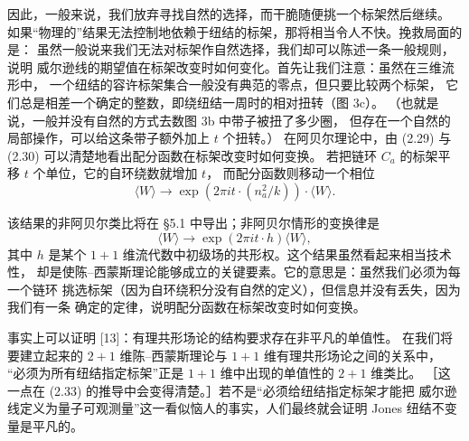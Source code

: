 \documentclass[11pt,a4paper]{article}
\begin{document}
因此，一般来说，我们放弃寻找自然的选择，而干脆随便挑一个标架然后继续。
如果“物理的”结果无法控制地依赖于纽结的标架，那将相当令人不快。挽救局面的是：
虽然一般说来我们无法对标架作自然选择，我们却可以陈述一条一般规则，说明
威尔逊线的期望值在标架改变时如何变化。首先让我们注意：虽然在三维流形中，
一个纽结的容许标架集合一般没有典范的零点，但只要比较两个标架，
它们总是相差一个确定的整数，即绕纽结一周时的相对扭转（图 3c）。
（也就是说，一般并没有自然的方式去数图 3b 中带子被扭了多少圈，
但存在一个自然的局部操作，可以给这条带子额外加上 $t$ 个扭转。）
在阿贝尔理论中，由 (2.29) 与 (2.30) 可以清楚地看出配分函数在标架改变时如何变换。
若把链环 $C_a$ 的标架平移 $t$ 个单位，它的自环绕数就增加 $t$，
而配分函数则移动一个相位
\begin{equation}
    \langle W\rangle\to\exp\left(2\pi i t\cdot (n_a^2/k)\right)\cdot\langle W\rangle .
    \tag{2.32}
\end{equation}

该结果的非阿贝尔类比将在 §5.1 中导出；非阿贝尔情形的变换律是
\begin{equation}
    \langle W\rangle\to\exp\left(2\pi i t\cdot h\right)\langle W\rangle ,
    \tag{2.33}
\end{equation}
其中 $h$ 是某个 $1+1$ 维流代数中初级场的共形权。这个结果虽然看起来相当技术性，
却是使陈–西蒙斯理论能够成立的关键要素。它的意思是：虽然我们必须为每一个链环
挑选标架（因为自环绕积分没有自然的定义），但信息并没有丢失，因为我们有一条
确定的定律，说明配分函数在标架改变时如何变换。


事实上可以证明 [13]：有理共形场论的结构要求存在非平凡的单值性。
在我们将要建立起来的 $2+1$ 维陈–西蒙斯理论与 $1+1$ 维有理共形场论之间的关系中，
“必须为所有纽结指定标架”正是 $1+1$ 维中出现的单值性的 $2+1$ 维类比。
［这一点在 (2.33) 的推导中会变得清楚。］若不是“必须给纽结指定标架才能把
威尔逊线定义为量子可观测量”这一看似恼人的事实，人们最终就会证明
Jones 纽结不变量是平凡的。
\end{document}
